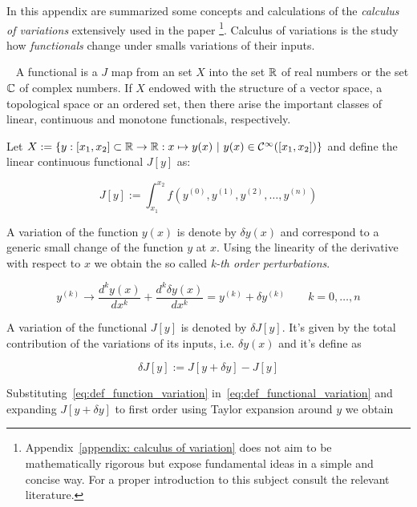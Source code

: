In this appendix are summarized some concepts and calculations of the
\emph{calculus of variations} extensively used in the paper
\footnote{
  Appendix~\ref{appendix: calculus of variation} does not aim to be
  mathematically rigorous but expose fundamental ideas in a simple and concise
  way. For a proper introduction to this subject consult the relevant
  literature.
}.
Calculus of variations is the study how \emph{functionals} change under smalls
variations of their inputs.

\begin{definition}~\cite{Functional_Encyclopedia_of_Mathematics}
  A functional is a $J$ map from an set $X$ into the set $\mathbb{R}$ of real
  numbers or the set $\mathbb{C}$ of complex numbers. If $X$ endowed with the
  structure of a vector space, a topological space or an ordered set, then
  there arise the important classes of linear, continuous and monotone
  functionals, respectively.
\end{definition}

Let $X:=\{y: [x_1, x_2] \subset \mathbb{R} \rightarrow \mathbb{R}: x \mapsto
y(x) \ | \ y(x) \in \mathcal{C}^{\infty}([x_1, x_2])\}$ and define the linear
continuous functional $J[y]$ as:

\begin{equation} \label{eq:def_functional}
  J[y] := \int_{x_1}^{x_2} f(y^{(0)}, y^{(1)}, y^{(2)}, \ldots, y^{(n)})
\end{equation}

A variation of the function $y(x)$ is denote by $\delta y(x)$ and correspond to
a generic small change of the function $y$ at $x$. Using the linearity of the
derivative with respect to $x$ we obtain the so called \emph{k-th order
perturbations}.

\begin{equation} \label{eq:def_function_variation}
  y^{(k)} \rightarrow \frac{d^k y(x)}{dx^k} + \frac{d^k\delta y(x)}{dx^k} =
  y^{(k)} + \delta y^{(k)} \qquad k=0, \ldots, n
\end{equation}

A variation of the functional $J[y]$ is denoted by $\delta J[y]$. It's given by
the total contribution of the variations of its inputs, i.e. $\delta y(x)$ and
it's define as

\begin{equation} \label{eq:def_functional_variation}
  \delta J[y] := J[y + \delta y] - J[y]
\end{equation}

Substituting~\eqref{eq:def_function_variation}
in~\eqref{eq:def_functional_variation} and expanding $J[y + \delta y]$ to first
order using Taylor expansion around $y$ we obtain

